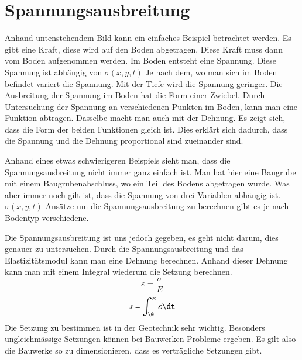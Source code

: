 \section{Spannungsausbreitung\label{spannung:section:Spannungsausbreitung}}
Anhand untenstehendem Bild kann ein einfaches Beispiel betrachtet werden.
Es gibt eine Kraft, diese wird auf den Boden abgetragen.
Diese Kraft muss dann vom Boden aufgenommen werden.
Im Boden entsteht eine Spannung. Diese Spannung ist abhängig von $\sigma(x,y,t)$
Je nach dem, wo man sich im Boden befindet variert die Spannung.
Mit der Tiefe wird die Spannung geringer.
Die Ausbreitung der Spannung im Boden hat die Form einer Zwiebel.
Durch Untersuchung der Spannung an verschiedenen Punkten im Boden, kann man eine Funktion abtragen.
Dasselbe macht man auch mit der Dehnung. Es zeigt sich, dass die Form der beiden Funktionen gleich ist.
Dies erklärt sich dadurch, dass die Spannung und die Dehnung proportional sind zueinander sind.

Anhand eines etwas schwierigeren Beispiels sieht man,
dass die Spannungsausbreitung nicht immer ganz einfach ist.
Man hat hier eine Baugrube mit einem Baugrubenabschluss, wo ein Teil des Bodens abgetragen wurde.
Was aber immer noch gilt ist, dass die Spannung von drei Variablen abhängig ist. $\sigma(x,y,t)$
Ansätze um die Spannungsausbreitung zu berechnen gibt es je nach Bodentyp verschiedene.

Die Spannungsausbreitung ist uns jedoch gegeben, es geht nicht darum, dies genauer zu untersuchen.
Durch die Spannungsausbreitung und das Elastizitätsmodul kann man eine Dehnung berechnen.
Anhand dieser Dehnung kann man mit einem Integral wiederum die Setzung berechnen.
\[
\varepsilon
=
\frac{\sigma}{E}
\]
\[
s
=
\int_{\0}^{\infty} \varepsilon \dt
\]
Die Setzung zu bestimmen ist in der Geotechnik sehr wichtig.
Besonders ungleichmässige Setzungen können bei Bauwerken Probleme ergeben.
Es gilt also die Bauwerke so zu dimensionieren, dass es verträgliche Setzungen gibt.


